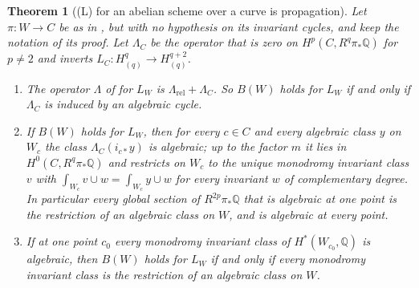 \documentclass[11pt,reqno]{amsart}
\theoremstyle{plain}
\newtheorem{theorem}{Theorem}[section]
\theoremstyle{definition}
\theoremstyle{remark}
\newcommand{\QQ}{\mathbb{Q}}
\begin{document}
\begin{theorem}[\textup{(L)} for an abelian scheme over a curve is
propagation]\label{thm:lefschetzpropagation}
Let $\pi\colon W\to C$ be as in , but with no
hypothesis on its invariant cycles, and keep the notation of its proof. Let
$\Lambda_{C}$ be the operator that is zero on $H^{p}(C,R^{q}\pi_{*}\QQ)$ for
$p\ne2$ and inverts $L_{C}\colon H^{q}_{(q)}\to H^{q+2}_{(q)}$.
\begin{enumerate}[label=\textup{(\roman*)},leftmargin=2.6em,itemsep=2pt]
\item The operator $\Lambda$ of \cite[Definition~10.6]{paperI} for $L_{W}$ is
  $\Lambda_{\mathrm{rel}}+\Lambda_{C}$. So $B(W)$ holds for $L_{W}$ if and
  only if $\Lambda_{C}$ is induced by an algebraic cycle.
\item If $B(W)$ holds for $L_{W}$, then for every $c\in C$ and every algebraic
  class $y$ on $W_{c}$ the class $\Lambda_{C}(i_{c*}y)$ is algebraic; up to
  the factor $m$ it lies in $H^{0}(C,R^{q}\pi_{*}\QQ)$ and restricts on
  $W_{c}$ to the unique monodromy invariant class $v$ with
  $\int_{W_{c}}v\cup w=\int_{W_{c}}y\cup w$ for every invariant $w$ of
  complementary degree. In particular every global section of
  $R^{2p}\pi_{*}\QQ$ that is algebraic at one point is the restriction of an
  algebraic class on $W$, and is algebraic at every point.
\item If at one point $c_{0}$ every monodromy invariant class of
  $H^{*}(W_{c_{0}},\QQ)$ is algebraic, then $B(W)$ holds for $L_{W}$ if and
  only if every monodromy invariant class is the restriction of an algebraic
  class on $W$.
\end{enumerate}
\end{theorem}
\end{document}
